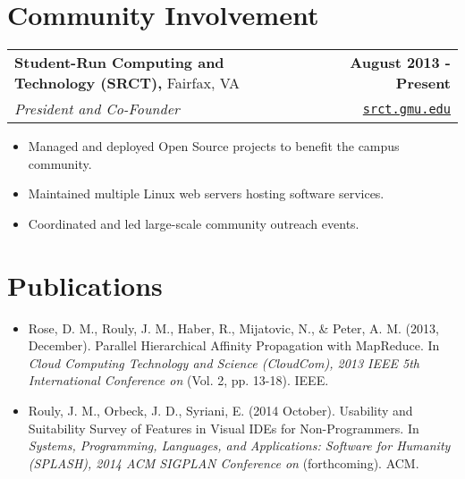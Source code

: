 \documentclass[letterpaper]{article}
\newenvironment{details}
{\begin{itemize}}
{\end{itemize}}
\begin{document}
%


  \section{Community Involvement}
  \noindent
  \begin{tabularx}{\textwidth}{@{}X r@{}}
    \textbf{Student-Run Computing and Technology (SRCT),} Fairfax, VA & \textbf{August 2013 - Present} \\
    \emph{President and Co-Founder} & \texttt{\href{srct.gmu.edu}{srct.gmu.edu}}
  \end{tabularx}

  \begin{details}
  \item Managed and deployed Open Source projects to benefit the campus community.
  \item Maintained multiple Linux web servers hosting software services.
  \item Coordinated and led large-scale community outreach events.
  \end{details}


  \section{Publications}
  \noindent
  \begin{details}
  \item Rose, D. M., Rouly, J. M., Haber, R., Mijatovic, N., \& Peter, A.
  M.  (2013, December). Parallel Hierarchical Affinity Propagation with
  MapReduce. In \emph{Cloud Computing Technology and Science (CloudCom),
  2013 IEEE 5th International Conference on} (Vol. 2, pp. 13-18). IEEE.

  \item Rouly, J. M., Orbeck, J. D., Syriani, E. (2014 October). Usability
  and Suitability Survey of Features in Visual IDEs for Non-Programmers.
  In \emph{Systems, Programming, Languages, and Applications: Software for
  Humanity (SPLASH), 2014 ACM SIGPLAN Conference on} (forthcoming). ACM.
  \end{details}
\end{document}
